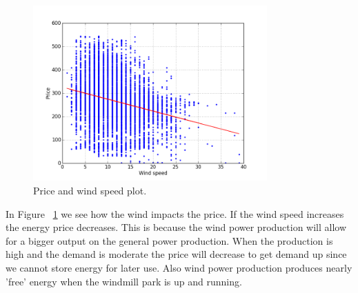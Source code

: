\begin{figure}[H]
\centering
\includegraphics[width=0.8\textwidth ,natwidth=410,natheight=237]{billeder/energy_price_plots/price_wind.png}
\caption{Price and wind speed plot.}
\label{fig:price_wind}
\end{figure}

In Figure ~\ref{fig:price_wind} we see how the wind impacts the price. If the wind speed increases the energy price decreases. This is because the wind power production will allow for a bigger output on the general power production. When the production is high and the demand is moderate the price will decrease to get demand up since we cannot store energy for later use. Also wind power production produces nearly 'free' energy when the windmill park is up and running.


